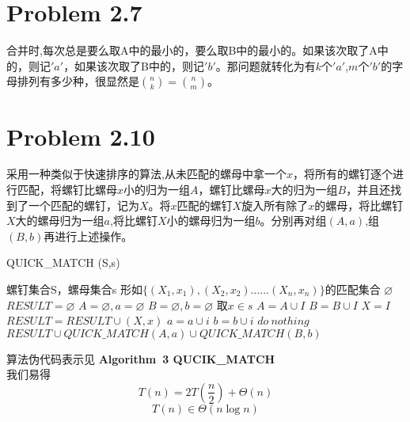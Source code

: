 \documentclass[twocolumn]{ctexart}
\begin{document}
	\section*{Problem 2.7}
	\indent 合并时,每次总是要么取A中的最小的，要么取B中的最小的。如果该次取了A中的，则记$'a'$，如果该次取了B中的，则记$'b'$。那问题就转化为有$k$个$'a'$,$m$个$'b'$的字母排列有多少种，很显然是$\binom{n}{k}=\binom{n}{m}$。\\
	
	\section*{Problem 2.10}
	\indent 采用一种类似于快速排序的算法,从未匹配的螺母中拿一个$x$，将所有的螺钉逐个进行匹配，将螺钉比螺母$x$小的归为一组$A$，螺钉比螺母$x$大的归为一组$B$，并且还找到了一个匹配的螺钉，记为$X$。将$x$匹配的螺钉$X$旋入所有除了$x$的螺母，将比螺钉$X$大的螺母归为一组$a$,将比螺钉$X$小的螺母归为一组$b$。分别再对组$(A,a)$,组$(B,b)$再进行上述操作。\\
	\begin{algorithm}[htbp]
		\caption {QUICK\_MATCH (S,s)}
		\begin{algorithmic}[1]
			\REQUIRE
			螺钉集合S，螺母集合s 
			\ENSURE
			形如$\{(X_1,x_1),(X_2,x_2) ……(X_n,x_n)\}$的匹配集合
					\RETURN $\varnothing$
			\ENDIF
			\STATE $RESULT= \varnothing$
			\STATE $A=\varnothing,a=\varnothing$
			\STATE $B=\varnothing,b=\varnothing$
			\STATE 取$x\in s$
					\STATE $A=A\cup{I}$
					\STATE $B=B\cup{I}$
				\ELSE
					\STATE $X=I$
					\STATE $RESULT=RESULT \cup {(X,x)}$
				\ENDIF
			\ENDFOR 
					\STATE $a=a\cup{i}$
					\STATE $b=b\cup{i}$
				\ELSE
					\STATE $do\ nothing$
				\ENDIF
			\ENDFOR 
			\RETURN $RESULT \cup QUICK\_MATCH(A,a) \cup QUICK\_MATCH(B,b)$
		\end{algorithmic}
	\end{algorithm}
	\indent 算法伪代码表示见 \textbf{Algorithm\ 3 QUCIK\_MATCH}\\
	\indent 我们易得\[T(n)=2T(\frac{n}{2})+\Theta(n)\]
	\[T(n)\in \Theta(n\log{n})\]
\end{document}

